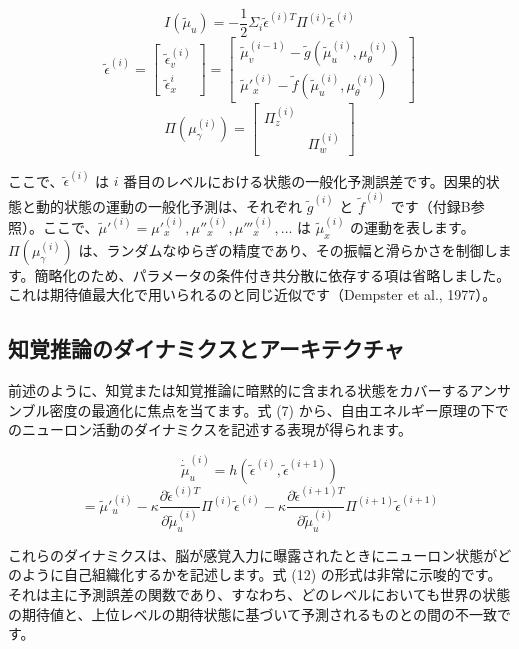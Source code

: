 \documentclass{article}
\begin{document}
$$I(\tilde{\mu}_u)=-\frac{1}{2}\Sigma_i\tilde{\epsilon}^{(i)T}\varPi^{(i)}\tilde{\epsilon}^{(i)}$$
$$\tilde{\epsilon}^{(i)}=\left[
\begin{array}{c}
\tilde{\epsilon}^{(i)}_v \\
\tilde{\epsilon}^{i}_x
\end{array}
\right]
=\left[
\begin{array}{c}
\tilde{\mu}^{(i-1)}_v-\tilde{g}(\tilde{\mu}^{(i)}_u,\mu^{(i)}_\theta) \\
\tilde{\mu}'^{(i)}_x-\tilde{f}(\tilde{\mu}^{(i)}_u,\mu^{(i)}_\theta)
\end{array}
\right]$$
$$\varPi(\mu_\gamma^{(i)})=\left[
\begin{array}{cc}
\varPi_z^{(i)} & \\
 & \varPi_w^{(i)}
\end{array}
\right]$$

ここで、$\tilde{\epsilon}^{(i)}$ は $i$ 番目のレベルにおける状態の一般化予測誤差です。因果的状態と動的状態の運動の一般化予測は、それぞれ $\tilde{g}^{(i)}$ と $\tilde{f}^{(i)}$ です（付録B参照）。ここで、$\tilde{\mu}'^{(i)}=\mu'^{(i)}_x,\mu''^{(i)}_x,\mu'''^{(i)}_x,\dots$ は $\tilde{\mu}_x^{(i)}$ の運動を表します。$\varPi(\mu_\gamma^{(i)})$ は、ランダムなゆらぎの精度であり、その振幅と滑らかさを制御します。簡略化のため、パラメータの条件付き共分散に依存する項は省略しました。これは期待値最大化で用いられるのと同じ近似です（Dempster et al., 1977）。

\subsection{知覚推論のダイナミクスとアーキテクチャ}
前述のように、知覚または知覚推論に暗黙的に含まれる状態をカバーするアンサンブル密度の最適化に焦点を当てます。式 (7) から、自由エネルギー原理の下でのニューロン活動のダイナミクスを記述する表現が得られます。

$$\dot{\tilde{\mu}}_u^{(i)}=h(\tilde{\epsilon}^{(i)},\tilde{\epsilon}^{(i+1)})$$
$$=\tilde{\mu}'^{(i)}_u-\kappa\frac{\partial\tilde{\epsilon}^{(i)T}}{\partial\tilde{\mu}_u^{(i)}}\varPi^{(i)}\tilde{\epsilon}^{(i)}-\kappa\frac{\partial\tilde{\epsilon}^{(i+1)T}}{\partial\tilde{\mu}_u^{(i)}}\varPi^{(i+1)}\tilde{\epsilon}^{(i+1)}$$

これらのダイナミクスは、脳が感覚入力に曝露されたときにニューロン状態がどのように自己組織化するかを記述します。式 (12) の形式は非常に示唆的です。それは主に予測誤差の関数であり、すなわち、どのレベルにおいても世界の状態の期待値と、上位レベルの期待状態に基づいて予測されるものとの間の不一致です。
\end{document}
